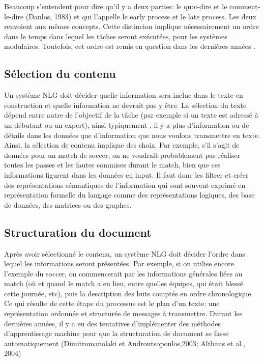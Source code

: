 Beaucoup s'entendent pour dire qu'il y a deux parties: le quoi-dire et le comment-le-dire (Danlos, 1983) et \citep{gatt18} qui l'appelle le early process et le late process. Les deux renvoient aux mêmes concepts. Cette distincion implique nécessairement un ordre dans le temps dans lequel les tâches seront exécutées, pour les systèmes modulaires. Toutefois, cet ordre est remis en question dans les dernières années \citep{gatt18}.

\subsection{Sélection du contenu}

Un système NLG doit décider quelle information sera inclue dans le texte en construction et quelle information ne devrait pas y être. La sélection du texte dépend entre autre de l'objectif de la tâche (par exemple si un texte est adressé à un débutant ou un expert), ainsi typiquement , il y a plus d'information ou de détails dans les données que d'information que nous voulons transmettre en texte. Ainsi, la sélection de contenu implique des choix. Par exemple, s'il s'agit de données pour un match de soccer, on ne voudrait probablement pas réaliser toutes les passes et les fautes commises durant le match, bien que ces informations figurent dans les données en input. Il faut donc les filtrer et créer des représentations sémantiques de l'information qui sont souvent exprimé en représentation formelle du langage comme des représentations logiques, des base de données, des matrices ou des graphes.

\subsection{Structuration du document}
Après avoir sélectionné le contenu, un système NLG doit décider l'ordre dans lequel les informations seront présentées. Par exemple, si on utilise encore l'exemple du soccer, on commencerait par les informations générales liées au match (où et quand le match a eu lieu, entre quelles équipes, qui était blessé cette journée, etc), puis la description des buts comptés en ordre chronologique. Ce qui résulte de cette étape du processus est le plan d'un texte: une représentation ordonnée et structurée de messages à transmettre. Durant les dernières années, il y a eu des tentatives d'implémenter des méthodes d'apprentissage machine pour que la structuration de document se fasse automatiquement (Dimitromanolaki et Androutsopoulos,2003; Althaus et al., 2004)

